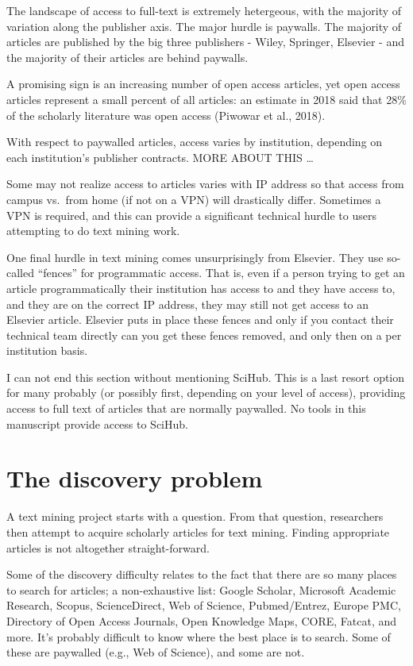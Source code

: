 \documentclass[author-year, review, 11pt]{components/elsarticle} %
\begin{document}
The landscape of access to full-text is extremely hetergeous, with the
majority of variation along the publisher axis. The major hurdle is
paywalls. The majority of articles are published by the big three
publishers - Wiley, Springer, Elsevier - and the majority of their
articles are behind paywalls.

A promising sign is an increasing number of open access articles, yet
open access articles represent a small percent of all articles: an
estimate in 2018 said that 28\% of the scholarly literature was open
access (Piwowar et al., 2018).

With respect to paywalled articles, access varies by institution,
depending on each institution's publisher contracts. MORE ABOUT THIS
\ldots{}

Some may not realize access to articles varies with IP address so that
access from campus vs.~from home (if not on a VPN) will drastically
differ. Sometimes a VPN is required, and this can provide a significant
technical hurdle to users attempting to do text mining work.

One final hurdle in text mining comes unsurprisingly from Elsevier. They
use so-called ``fences'' for programmatic access. That is, even if a
person trying to get an article programmatically their institution has
access to and they have access to, and they are on the correct IP
address, they may still not get access to an Elsevier article. Elsevier
puts in place these fences and only if you contact their technical team
directly can you get these fences removed, and only then on a per
institution basis.

I can not end this section without mentioning SciHub. This is a last
resort option for many probably (or possibly first, depending on your
level of access), providing access to full text of articles that are
normally paywalled. No tools in this manuscript provide access to
SciHub.

\hypertarget{the-discovery-problem}{%
\section{The discovery problem}\label{the-discovery-problem}}

A text mining project starts with a question. From that question,
researchers then attempt to acquire scholarly articles for text mining.
Finding appropriate articles is not altogether straight-forward.

Some of the discovery difficulty relates to the fact that there are so
many places to search for articles; a non-exhaustive list: Google
Scholar, Microsoft Academic Research, Scopus, ScienceDirect, Web of
Science, Pubmed/Entrez, Europe PMC, Directory of Open Access Journals,
Open Knowledge Maps, CORE, Fatcat, and more. It's probably difficult to
know where the best place is to search. Some of these are paywalled
(e.g., Web of Science), and some are not.
\end{document}
